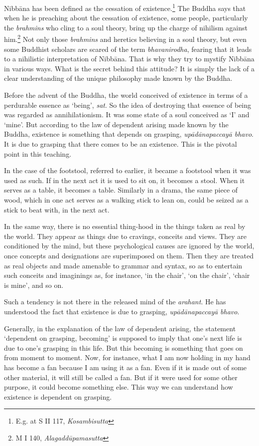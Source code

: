Nibbāna has been defined as the cessation of existence.\footnote{E.g. at S II 117, \emph{Kosambisutta}} The Buddha says that when he is preaching about the cessation of existence, some people, particularly the \emph{brahmins} who cling to a soul theory, bring up the charge of nihilism against him.\footnote{M I 140, \emph{Alagaddūpamasutta}} Not only those \emph{brahmins} and heretics believing in a soul theory, but even some Buddhist scholars are scared of the term \emph{bhavanirodha}, fearing that it leads to a nihilistic interpretation of Nibbāna. That is why they try to mystify Nibbāna in various ways. What is the secret behind this attitude? It is simply the lack of a clear understanding of the unique philosophy made known by the Buddha.

Before the advent of the Buddha, the world conceived of existence in terms of a perdurable essence as `being', \emph{sat}. So the idea of destroying that essence of being was regarded as annihilationism. It was some state of a soul conceived as `I' and `mine'. But according to the law of dependent arising made known by the Buddha, existence is something that depends on grasping, \emph{upādānapaccayā bhavo}. It is due to grasping that there comes to be an existence. This is the pivotal point in this teaching.

In the case of the footstool, referred to earlier, it became a footstool when it was used as such. If in the next act it is used to sit on, it becomes a stool. When it serves as a table, it becomes a table. Similarly in a drama, the same piece of wood, which in one act serves as a walking stick to lean on, could be seized as a stick to beat with, in the next act.

In the same way, there is no essential thing-hood in the things taken as real by the world. They appear as things due to cravings, conceits and views. They are conditioned by the mind, but these psychological causes are ignored by the world, once concepts and designations are superimposed on them. Then they are treated as real objects and made amenable to grammar and syntax, so as to entertain such conceits and imaginings as, for instance, `in the chair', `on the chair', `chair is mine', and so on.

Such a tendency is not there in the released mind of the \emph{arahant}. He has understood the fact that existence is due to grasping, \emph{upādānapaccayā bhavo}.

Generally, in the explanation of the law of dependent arising, the statement `dependent on grasping, becoming' is supposed to imply that one's next life is due to one's grasping in this life. But this becoming is something that goes on from moment to moment. Now, for instance, what I am now holding in my hand has become a fan because I am using it as a fan. Even if it is made out of some other material, it will still be called a fan. But if it were used for some other purpose, it could become something else. This way we can understand how existence is dependent on grasping.

